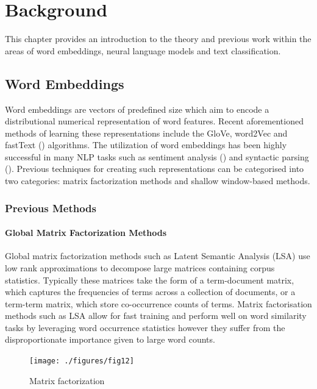 \chapter{Background}
\label{chap:background}
This chapter provides an introduction to the theory and previous work within the areas of word embeddings, neural language models and text classification. 

\section{Word Embeddings}
Word embeddings are vectors of predefined size which aim to encode a distributional numerical representation of word features. Recent aforementioned methods of learning these representations include the GloVe, word2Vec and fastText (\cite{Bojanowski2017}) algorithms. The utilization of word embeddings has been highly successful in many NLP tasks such as sentiment analysis (\cite{Socher2013}) and syntactic parsing (\cite{Socher2013}). Previous techniques for creating such representations can be categorised into two categories: matrix factorization methods and shallow window-based methods.
\subsection{Previous Methods}
\subsubsection{Global Matrix Factorization Methods}
Global matrix factorization methods such as Latent Semantic Analysis (LSA) use low rank approximations to decompose large matrices containing corpus statistics. Typically these matrices take the form of a term-document matrix, which captures the frequencies of terms across a collection of documents, or a term-term matrix, which store co-occurrence counts of terms. Matrix factorisation methods such as LSA allow for fast training and perform well on word similarity tasks by leveraging word occurrence statistics however they suffer from the disproportionate importance given to large word counts.

\noindent
\newline
\begin{figure}[h]
	\texttt{[image: ./figures/fig12]}
	\centering
	\caption{Matrix factorization}
	\label{fig:fig12}
\end{figure}
